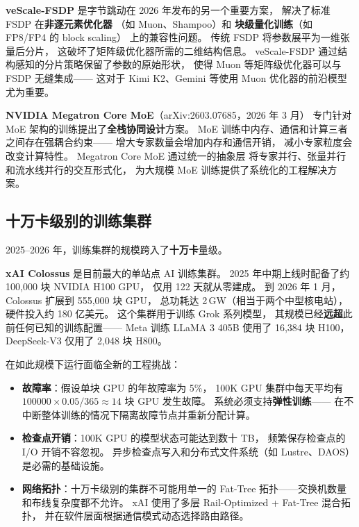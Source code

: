 \textbf{veScale-FSDP} 是字节跳动在 2026 年发布的另一个重要方案，%
解决了标准 FSDP 在\textbf{非逐元素优化器}
（如 Muon、Shampoo）和
\textbf{块级量化训练}（如 FP8/FP4 的 block scaling）
上的兼容性问题。
传统 FSDP 将参数展平为一维张量后分片，
这破坏了矩阵级优化器所需的二维结构信息。
veScale-FSDP 通过结构感知的分片策略保留了参数的原始形状，
使得 Muon 等矩阵级优化器可以与 FSDP 无缝集成——
这对于 Kimi K2、Gemini 等使用 Muon 优化器的前沿模型尤为重要。

\textbf{NVIDIA Megatron Core MoE}（arXiv:2603.07685，2026 年 3 月）%
专门针对 MoE 架构的训练提出了\textbf{全栈协同设计}方案。
MoE 训练中内存、通信和计算三者之间存在强耦合约束——
增大专家数量会增加内存和通信开销，
减小专家粒度会改变计算特性。
Megatron Core MoE 通过统一的抽象层
将专家并行、张量并行和流水线并行的交互形式化，
为大规模 MoE 训练提供了系统化的工程解决方案。

\subsection{十万卡级别的训练集群}
\label{sec:100k-gpu}

2025--2026 年，训练集群的规模跨入了\textbf{十万卡}量级。

\textbf{xAI Colossus} 是目前最大的单站点 AI 训练集群。
2025 年中期上线时配备了约 100,000 块 NVIDIA H100 GPU，
仅用 122 天就从零建成。
到 2026 年 1 月，Colossus 扩展到 555,000 块 GPU，
总功耗达 2\,GW（相当于两个中型核电站），
硬件投入约 180 亿美元。
这个集群用于训练 Grok 系列模型，
其规模已经\textbf{远超}此前任何已知的训练配置——
Meta 训练 LLaMA 3 405B 使用了 16,384 块 H100，
DeepSeek-V3 仅用了 2,048 块 H800。

在如此规模下运行面临全新的工程挑战：
\begin{itemize}[noitemsep]
  \item \textbf{故障率}：假设单块 GPU 的年故障率为 5\%，
        100K GPU 集群中每天平均有
        $100000 \times 0.05 / 365 \approx 14$ 块 GPU 发生故障。
        系统必须支持\textbf{弹性训练}——
        在不中断整体训练的情况下隔离故障节点并重新分配计算。
  \item \textbf{检查点开销}：100K GPU 的模型状态可能达到数十 TB，
        频繁保存检查点的 I/O 开销不容忽视。
        异步检查点写入和分布式文件系统（如 Lustre、DAOS）
        是必需的基础设施。
  \item \textbf{网络拓扑}：十万卡级别的集群不可能用单一的
        Fat-Tree 拓扑——交换机数量和布线复杂度都不允许。
        xAI 使用了多层 Rail-Optimized + Fat-Tree 混合拓扑，
        并在软件层面根据通信模式动态选择路由路径。
\end{itemize}

